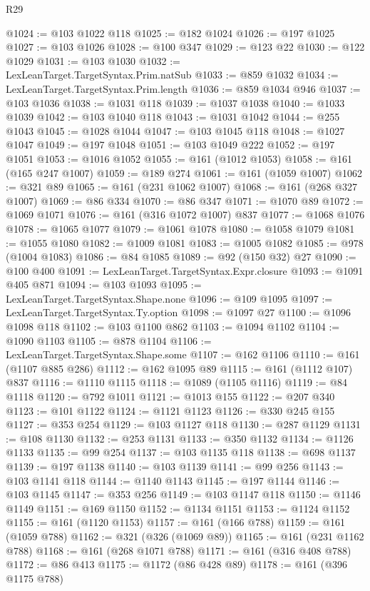 \begin{lexlean}{R29}
\begin{coremodule}
@1024 := @103 @1022 @118
@1025 := @182 @1024
@1026 := @197 @1025
@1027 := @103 @1026
@1028 := @100 @347
@1029 := @123 @22
@1030 := @122 @1029
@1031 := @103 @1030
@1032 := LexLeanTarget.TargetSyntax.Prim.natSub
@1033 := @859 @1032
@1034 := LexLeanTarget.TargetSyntax.Prim.length
@1036 := @859 @1034 @946
@1037 := @103 @1036
@1038 := @1031 @118
@1039 := @1037 @1038
@1040 := @1033 @1039
@1042 := @103 @1040 @118
@1043 := @1031 @1042
@1044 := @255 @1043
@1045 := @1028 @1044
@1047 := @103 @1045 @118
@1048 := @1027 @1047
@1049 := @197 @1048
@1051 := @103 @1049 @222
@1052 := @197 @1051
@1053 := @1016 @1052
@1055 := @161 (@1012 @1053)
@1058 := @161 (@165 @247 @1007)
@1059 := @189 @274
@1061 := @161 (@1059 @1007)
@1062 := @321 @89
@1065 := @161 (@231 @1062 @1007)
@1068 := @161 (@268 @327 @1007)
@1069 := @86 @334
@1070 := @86 @347
@1071 := @1070 @89
@1072 := @1069 @1071
@1076 := @161 (@316 @1072 @1007) @837
@1077 := @1068 @1076
@1078 := @1065 @1077
@1079 := @1061 @1078
@1080 := @1058 @1079
@1081 := @1055 @1080
@1082 := @1009 @1081
@1083 := @1005 @1082
@1085 := @978 (@1004 @1083)
@1086 := @84 @1085
@1089 := @92 (@150 @32) @27
@1090 := @100 @400
@1091 := LexLeanTarget.TargetSyntax.Expr.closure
@1093 := @1091 @405 @871
@1094 := @103 @1093
@1095 := LexLeanTarget.TargetSyntax.Shape.none
@1096 := @109 @1095
@1097 := LexLeanTarget.TargetSyntax.Ty.option
@1098 := @1097 @27
@1100 := @1096 @1098 @118
@1102 := @103 @1100 @862
@1103 := @1094 @1102
@1104 := @1090 @1103
@1105 := @878 @1104
@1106 := LexLeanTarget.TargetSyntax.Shape.some
@1107 := @162 @1106
@1110 := @161 (@1107 @885 @286)
@1112 := @162 @1095 @89
@1115 := @161 (@1112 @107) @837
@1116 := @1110 @1115
@1118 := @1089 (@1105 @1116)
@1119 := @84 @1118
@1120 := @792 @1011
@1121 := @1013 @155
@1122 := @207 @340
@1123 := @101 @1122
@1124 := @1121 @1123
@1126 := @330 @245 @155
@1127 := @353 @254
@1129 := @103 @1127 @118
@1130 := @287 @1129
@1131 := @108 @1130
@1132 := @253 @1131
@1133 := @350 @1132
@1134 := @1126 @1133
@1135 := @99 @254
@1137 := @103 @1135 @118
@1138 := @698 @1137
@1139 := @197 @1138
@1140 := @103 @1139
@1141 := @99 @256
@1143 := @103 @1141 @118
@1144 := @1140 @1143
@1145 := @197 @1144
@1146 := @103 @1145
@1147 := @353 @256
@1149 := @103 @1147 @118
@1150 := @1146 @1149
@1151 := @169 @1150
@1152 := @1134 @1151
@1153 := @1124 @1152
@1155 := @161 (@1120 @1153)
@1157 := @161 (@166 @788)
@1159 := @161 (@1059 @788)
@1162 := @321 (@326 (@1069 @89))
@1165 := @161 (@231 @1162 @788)
@1168 := @161 (@268 @1071 @788)
@1171 := @161 (@316 @408 @788)
@1172 := @86 @413
@1175 := @1172 (@86 @428 @89)
@1178 := @161 (@396 @1175 @788)

\end{coremodule}
\end{lexlean}
